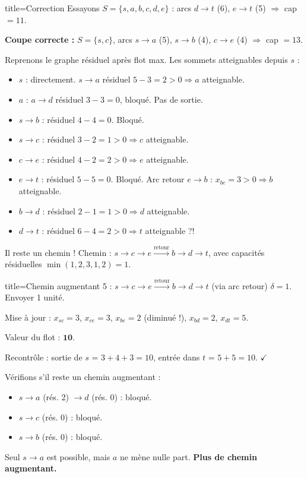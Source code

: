 \documentclass[12pt,a4paper]{article}
\begin{document}
\begin{correction}{title=Correction}
Essayons $S = \{s, a, b, c, d, e\}$ : arcs $d \to t$ (6), $e \to t$ (5) $\Rightarrow$ cap $= 11$.

\textbf{Coupe correcte :} $S = \{s, c\}$, arcs $s \to a$ (5), $s \to b$ (4), $c \to e$ (4) $\Rightarrow$ cap $= 13$.

Reprenons le graphe r\'esiduel apr\`es flot max. Les sommets atteignables depuis $s$ :
\begin{itemize}[nosep]
    \item $s$ : directement. $s \to a$ r\'esiduel $5-3=2 > 0 \Rightarrow a$ atteignable.
    \item $a$ : $a \to d$ r\'esiduel $3-3=0$, bloqu\'e. Pas de sortie.
    \item $s \to b$ : r\'esiduel $4-4=0$. Bloqu\'e.
    \item $s \to c$ : r\'esiduel $3-2=1 > 0 \Rightarrow c$ atteignable.
    \item $c \to e$ : r\'esiduel $4-2=2 > 0 \Rightarrow e$ atteignable.
    \item $e \to t$ : r\'esiduel $5-5=0$. Bloqu\'e. Arc retour $e \to b$ : $x_{be}=3 > 0 \Rightarrow b$ atteignable.
    \item $b \to d$ : r\'esiduel $2-1=1 > 0 \Rightarrow d$ atteignable.
    \item $d \to t$ : r\'esiduel $6-4=2 > 0 \Rightarrow t$ atteignable ?!
\end{itemize}

Il reste un chemin ! Chemin : $s \to c \to e \xrightarrow{\text{retour}} b \to d \to t$, avec capacit\'es r\'esiduelles $\min(1, 2, 3, 1, 2) = 1$.

\medskip
\begin{etape}{title=Chemin augmentant 5 : $s \to c \to e \xrightarrow{\text{retour}} b \to d \to t$ (via arc retour)}
$\delta = 1$. Envoyer 1 unit\'e.

Mise \`a jour :
$x_{sc} = 3$, $x_{ce} = 3$, $x_{be} = 2$ (diminu\'e !), $x_{bd} = 2$, $x_{dt} = 5$.

Valeur du flot : $\mathbf{10}$.
\end{etape}

Recontr\^ole : sortie de $s$ = $3+4+3 = 10$, entr\'ee dans $t$ = $5+5 = 10$. $\checkmark$

V\'erifions s'il reste un chemin augmentant :
\begin{itemize}[nosep]
    \item $s \to a$ (r\'es. 2) $\to d$ (r\'es. 0) : bloqu\'e.
    \item $s \to c$ (r\'es. 0) : bloqu\'e.
    \item $s \to b$ (r\'es. 0) : bloqu\'e.
\end{itemize}
Seul $s \to a$ est possible, mais $a$ ne m\`ene nulle part. \textbf{Plus de chemin augmentant.}


\end{correction}
\end{document}
